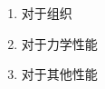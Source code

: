 \documentclass[
class = book,
zihao = -4,
font = noto,
paper = a4paper,
openany
]{easybook}
\begin{document}

	\begin{enumerate}
		\item 对于组织
		\item 对于力学性能
		\item 对于其他性能
	\end{enumerate}


	\backmatter
	\listoffigures
	\listoftables
	\clearpage
	
\end{document}
